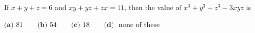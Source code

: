 If $x+y+z=6$ and $xy+yz+zx=11$, then the value of $x^3+y^3+z^3-3xyz$ is

$\textbf{(a) }81\qquad\textbf{(b) }54\qquad\textbf{(c) }18\qquad\textbf{(d) }$ none of these

